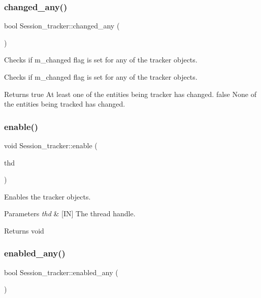 \subsubsection{\texorpdfstring{changed\+\_\+any()}{changed\_any()}}
{\footnotesize\ttfamily bool Session\+\_\+tracker\+::changed\+\_\+any (\begin{DoxyParamCaption}{ }\end{DoxyParamCaption})}



Checks if m\+\_\+changed flag is set for any of the tracker objects. 

Checks if m\+\_\+changed flag is set for any of the tracker objects.

\begin{DoxyReturn}{Returns}
true At least one of the entities being tracker has changed. false None of the entities being tracked has changed. 
\end{DoxyReturn}
\mbox{\label{classSession__tracker_a912c89049fcc0ff1dbe0b06e05e790e8}} 
\subsubsection{\texorpdfstring{enable()}{enable()}}
{\footnotesize\ttfamily void Session\+\_\+tracker\+::enable (\begin{DoxyParamCaption}\item[{T\+HD $\ast$}]{thd }\end{DoxyParamCaption})}



Enables the tracker objects. 


\begin{DoxyParams}{Parameters}
{\em thd} & \mbox{[}IN\mbox{]} The thread handle.\\
\hline
\end{DoxyParams}
\begin{DoxyReturn}{Returns}
void 
\end{DoxyReturn}
\mbox{\label{classSession__tracker_a7a754beda4f780ce535a3ea201155b29}} 
\subsubsection{\texorpdfstring{enabled\+\_\+any()}{enabled\_any()}}
{\footnotesize\ttfamily bool Session\+\_\+tracker\+::enabled\+\_\+any (\begin{DoxyParamCaption}{ }\end{DoxyParamCaption})}



